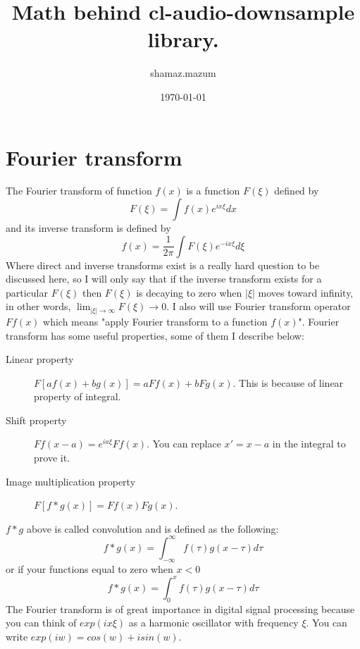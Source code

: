 \documentclass[a4paper,11pt,fleqn]{article}
\date{\today}
\author{shamaz.mazum}
\title{Math behind cl-audio-downsample library.}
\begin{document}
\maketitle
\section{Fourier transform}
The Fourier transform of function $f(x)$ is a function $F(\xi)$ defined by
\begin{equation}
F(\xi) = \int f(x)e^{ix\xi}dx
\end{equation}
and its inverse transform is defined by 
\begin{equation}
f(x) = \frac{1}{2\pi}\int F(\xi)e^{-ix\xi}d\xi
\end{equation}
Where direct and inverse transforms exist is a really hard question to be discussed here, so I will only say
that if the inverse transform exists for a particular $F(\xi)$ then $F(\xi)$ is decaying to zero when 
$\left|\xi\right|$ moves toward infinity, in other words, $\lim_{\left|\xi\right| \to \infty} F(\xi) \to 0$.
I also will use Fourier transform operator $Ff(x)$ which means "apply Fourier transform to a function $f(x)$".
Fourier transform has some useful properties, some of them I describe below:
\begin{description}
\item[Linear property] $F[af(x)+bg(x)] = aFf(x) + bFg(x)$. This is because of linear property of integral.
\item[Shift property] $Ff(x-a) = e^{ia\xi}Ff(x)$. You can replace $x' = x - a$ in the integral to prove it.
\item[Image multiplication property] $F[f*g(x)] = Ff(x)Fg(x)$.
\end{description}
$f*g$ above is called convolution and is defined as the following:
\begin{equation}
f*g(x) = \int_{-\infty}^{\infty}f(\tau)g(x-\tau)d\tau
\end{equation}
or if your functions equal to zero when $x<0$ 
\begin{equation} \label{convolve2}
f*g(x) = \int_{0}^{x}f(\tau)g(x-\tau)d\tau
\end{equation}
The Fourier transform is of great importance in digital signal processing because you can think of $exp(ix\xi)$
as a harmonic oscillator with frequency $\xi$. You can write $exp(iw) = cos(w) + isin(w)$.
\end{document}
